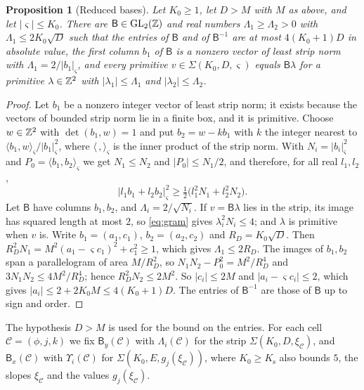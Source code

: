 \documentclass[11pt,reqno]{amsart}
\newtheorem{proposition}[theorem]{Proposition}
\theoremstyle{definition}
\theoremstyle{remark}
\numberwithin{equation}{section}
\begin{document}
\begin{proposition}[Reduced bases]\label{prop:bridge}
Let $K_0\ge1$, let $D>M$ with $M$ as above, and let $|\varsigma|\le K_0$. There are
$\mathsf B\in\mathrm{GL}_2(\mathbb Z)$ and real numbers $\Lambda_1\ge\Lambda_2>0$ with
$\Lambda_1\le2K_0\sqrt D$ such that the entries of $\mathsf B$ and of $\mathsf B^{-1}$ are
at most $4(K_0+1)D$ in absolute value, the first column $b_1$ of $\mathsf B$ is a
nonzero vector of least strip norm with $\Lambda_1=2/|b_1|_\varsigma$, and every
primitive $v\in\Sigma(K_0,D,\varsigma)$ equals $\mathsf B\lambda$ for a primitive
$\lambda\in\mathbb Z^2$ with $|\lambda_1|\le\Lambda_1$ and
$|\lambda_2|\le\Lambda_2$.
\end{proposition}
\begin{proof}
Let $b_1$ be a nonzero integer vector of least strip norm; it exists because
the vectors of bounded strip norm lie in a finite box, and it is primitive.
Choose $w\in\mathbb Z^2$ with $\det(b_1,w)=1$ and put $b_2=w-kb_1$ with $k$ the
integer nearest to $\langle b_1,w\rangle_\varsigma/|b_1|_\varsigma^2$, where
$\langle\,,\rangle_\varsigma$ is the inner product of the strip norm. With
$N_i=|b_i|_\varsigma^2$ and $P_0=\langle b_1,b_2\rangle_\varsigma$ we get $N_1\le N_2$ and
$|P_0|\le N_1/2$, and therefore, for all real $l_1,l_2$,
\begin{equation}\label{eq:gram}
 |l_1b_1+l_2b_2|_\varsigma^2\ge\tfrac12\bigl(l_1^2N_1+l_2^2N_2\bigr).
\end{equation}
Let $\mathsf B$ have columns $b_1,b_2$, and $\Lambda_i=2/\sqrt{N_i}$. If
$v=\mathsf B\lambda$ lies in the strip, its image has squared length at most $2$, so
\eqref{eq:gram} gives $\lambda_i^2N_i\le4$; and $\lambda$ is primitive when
$v$ is. Write $b_1=(a_1,c_1)$, $b_2=(a_2,c_2)$ and $R_D=K_0\sqrt D$. Then
$R_D^2N_1=M^2(a_1-\varsigma c_1)^2+c_1^2\ge1$, which gives
$\Lambda_1\le2R_D$. The images of $b_1,b_2$ span a parallelogram of area
$M/R_D^2$, so $N_1N_2-P_0^2=M^2/R_D^4$ and $3N_1N_2\le4M^2/R_D^4$; hence
$R_D^2N_2\le2M^2$. So $|c_i|\le2M$ and $|a_i-\varsigma c_i|\le2$, which gives
$|a_i|\le2+2K_0M\le4(K_0+1)D$. The entries of $\mathsf B^{-1}$ are those of $\mathsf B$ up
to sign and order.
\end{proof}
The hypothesis $D>M$ is used for the bound on the entries. For each cell
$\mathcal C=(\phi,j,k)$ we fix $\mathsf B_y(\mathcal C)$ with
$\Lambda_i(\mathcal C)$ for the strip $\Sigma(K_0,D,\xi_{\mathcal C})$, and
$\mathsf B_x(\mathcal C)$ with $\Upsilon_i(\mathcal C)$ for
$\Sigma(K_0,E,g_j(\xi_{\mathcal C}))$, where $K_0\ge K_{\mathrm s}$ also
bounds $5$, the slopes $\xi_{\mathcal C}$ and the values
$g_j(\xi_{\mathcal C})$.
\end{document}
